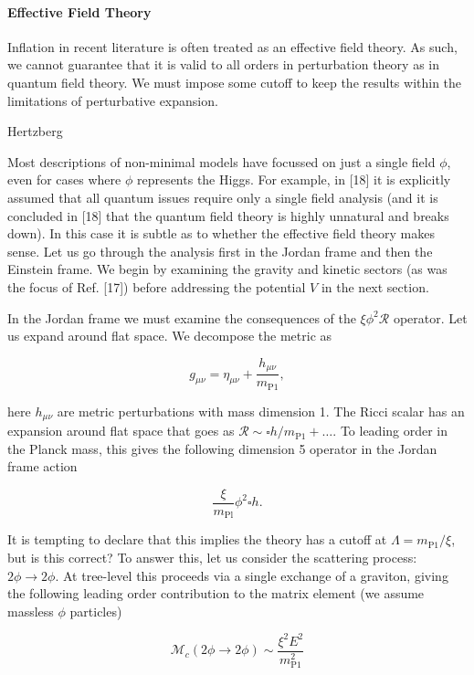 \paragraph{Effective Field Theory}

Inflation in recent literature is often treated as an effective field theory. As such, we cannot guarantee that it is valid to all orders in perturbation theory as in quantum field theory. We must impose some cutoff to keep the results within the limitations of perturbative expansion.

Hertzberg


Most descriptions of non-minimal models have focussed on just a single field $\phi$, even for cases where $\phi$ represents the Higgs. For example, in [18] it is explicitly assumed that all quantum issues require only a single field analysis (and it is concluded in [18] that the quantum field theory is highly unnatural and breaks down). In this case it is subtle as to whether the effective field theory makes sense. Let us go through the analysis first in the Jordan frame and then the Einstein frame. We begin by examining the gravity and kinetic sectors (as was the focus of Ref. [17]) before addressing the potential $V$ in the next section.

In the Jordan frame we must examine the consequences of the $\xi \phi^2 \mathcal{R}$ operator. Let us expand around flat space. We decompose the metric as

$$
g_{\mu \nu}=\eta_{\mu \nu}+\frac{h_{\mu \nu}}{m_{\mathrm{P} 1}},
$$

here $h_{\mu \nu}$ are metric perturbations with mass dimension 1. The Ricci scalar has an expansion around flat space that goes as $\mathcal{R} \sim \square h / m_{\mathrm{P} 1}+\ldots$. To leading order in the Planck mass, this gives the following dimension 5 operator in the Jordan frame action

$$
\frac{\xi}{m_{\mathrm{Pl}}} \phi^2 \square h .
$$


It is tempting to declare that this implies the theory has a cutoff at $\Lambda=m_{\mathrm{P} 1} / \xi$, but is this correct? To answer this, let us consider the scattering process: $2 \phi \rightarrow 2 \phi$. At tree-level this proceeds via a single exchange of a graviton, giving the following leading order contribution to the matrix element (we assume massless $\phi$ particles)

$$
\mathcal{M}_c(2 \phi \rightarrow 2 \phi) \sim \frac{\xi^2 E^2}{m_{\mathrm{P} 1}^2}
$$


